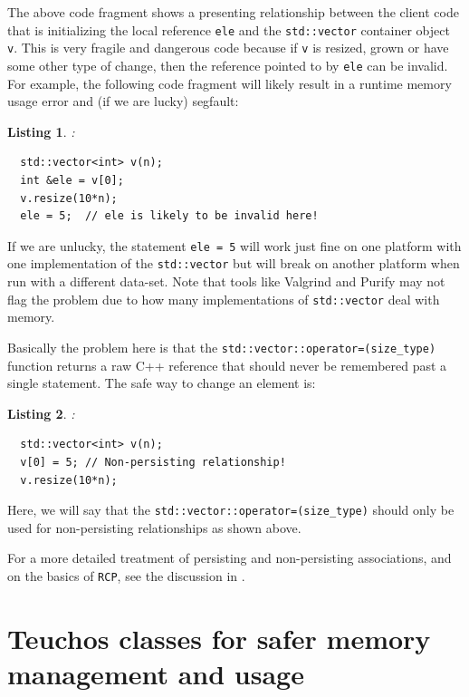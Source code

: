 \documentclass[pdf,ps2pdf,11pt]{SANDreport}
\newtheorem{listing}{Listing}
\begin{document}
The above code fragment shows a presenting relationship between the
client code that is initializing the local reference {}\texttt{ele}
and the {}\texttt{std::vector} container object {}\texttt{v}.  This is
very fragile and dangerous code because if {}\texttt{v} is resized,
grown or have some other type of change, then the reference pointed to
by {}\texttt{ele} can be invalid.  For example, the following code
fragment will likely result in a runtime memory usage error and (if
we are lucky) segfault:

\begin{listing}:\\
{\small\begin{verbatim}
  std::vector<int> v(n);
  int &ele = v[0];
  v.resize(10*n);
  ele = 5;  // ele is likely to be invalid here!
\end{verbatim}}
\end{listing}

If we are unlucky, the statement {}\texttt{ele = 5} will work just
fine on one platform with one implementation of the
{}\texttt{std::vector} but will break on another platform when run
with a different data-set.  Note that tools like Valgrind and Purify
may not flag the problem due to how many implementations of
{}\texttt{std::vector} deal with memory.

Basically the problem here is that the
{}\texttt{std::vector::operator=(size\_type)} function returns a raw
C++ reference that should never be remembered past a single statement.
The safe way to change an element is:

\begin{listing}:\\
{\small\begin{verbatim}
  std::vector<int> v(n);
  v[0] = 5; // Non-persisting relationship!
  v.resize(10*n);
\end{verbatim}}
\end{listing}

Here, we will say that the
{}\texttt{std::vector::operator=(size\_type)} should only be used for
non-persisting relationships as shown above.

For a more detailed treatment of persisting and non-persisting
associations, and on the basics of {}\texttt{RCP}, see the discussion
in {}\cite{RefCountPtrBeginnersGuide}.


%
{}\section{Teuchos classes for safer memory management and usage}
\label{sec:teuchos-mem-mng-classes}
%
\end{document}

